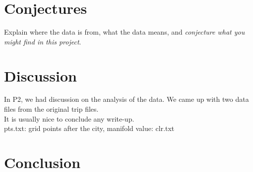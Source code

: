 \documentclass[11pt]{article}
\begin{document}
\pagebreak
\section*{Conjectures}

Explain where the data is
from, what the data means, and  {\em conjecture what you might find in this
project}.

\section*{Discussion}
In P2, we had discussion on the analysis of the data. We came up with two data files from the original trip files. \\
It is usually nice to conclude any write-up.\\

pts.txt: grid points after the city, 
manifold value: clr.txt
\section*{Conclusion}
\end{document}

